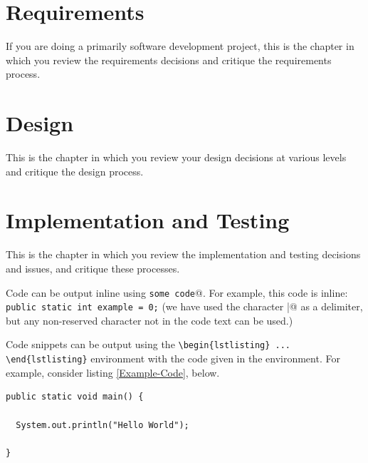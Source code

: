 \documentclass[12pt,a4paper]{report}
\begin{document}

\chapter{Requirements}

If you are doing a primarily software development project, this is the chapter in which you review the requirements decisions and critique the requirements process.

\chapter{Design}

This is the chapter in which you review your design decisions at various
levels and critique the design process.

\chapter{Implementation and Testing}

This is the chapter in which you review the implementation and testing decisions and issues, and critique these processes.

Code can be output inline using \verb@\lstinline|some code|@.  For example, this code is inline: \lstinline|public static int example = 0;| (we have used the character \verb@|@ as a delimiter, but any non-reserved character not in the code text can be used.)

Code snippets can be output using the \verb|\begin{lstlisting} ... \end{lstlisting}|
environment with the code given in the environment. For example, consider listing \ref{Example-Code}, below.

\begin{lstlisting}[breaklines,breakatwhitespace,caption={Example code},label=Example-Code]
public static void main() {

  System.out.println("Hello World");

}
\end{lstlisting}
\end{document}

